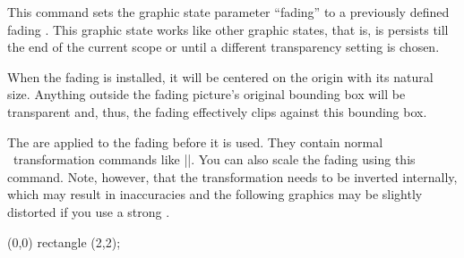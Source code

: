 \begin{command}{\pgfsetfading{}}
    This command sets the graphic state parameter ``fading'' to a previously
    defined fading . This graphic state works like other graphic
    states, that is, is persists till the end of the current scope or until a
    different transparency setting is chosen.

    When the fading is installed, it will be centered on the origin with its
    natural size. Anything outside the fading picture's original bounding box
    will be transparent and, thus, the fading effectively clips against this
    bounding box.

    The  are applied to the fading before it is used.
    They contain normal \pgfname\ transformation commands like
    |\pgftransformshift|. You can also scale the fading using this command.
    Note, however, that the transformation needs to be inverted internally,
    which may result in inaccuracies and the following graphics may be slightly
    distorted if you use a strong .
\begin{codeexample}[]
{\tikz \shade[left color=pgftransparent!0,
              right color=pgftransparent!100] (0,0) rectangle (2,2);}
\end{codeexample}
\begin{codeexample}[preamble={\pgfdeclarefading{fading2}
{\tikz \shade[left color=pgftransparent!0,
              right color=pgftransparent!100] (0,0) rectangle (2,2);}}]
\end{codeexample}
\end{command}

